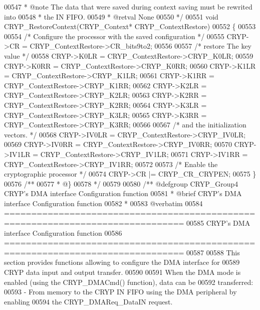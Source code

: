 \begin{DoxyCode}
00547 \textcolor{comment}{  * @note   The data that were saved during context saving must be rewrited into}
00548 \textcolor{comment}{  *         the IN FIFO.}
00549 \textcolor{comment}{  * @retval None}
00550 \textcolor{comment}{  */}
00551 \textcolor{keywordtype}{void} CRYP_RestoreContext(CRYP\_Context* CRYP\_ContextRestore)
00552 \{
00553 
00554   \textcolor{comment}{/* Configure the processor with the saved configuration */}
00555   CRYP->CR = CRYP\_ContextRestore->CR\_bits9to2;
00556 
00557   \textcolor{comment}{/* restore The key value */}
00558   CRYP->K0LR = CRYP\_ContextRestore->CRYP\_K0LR;
00559   CRYP->K0RR = CRYP\_ContextRestore->CRYP\_K0RR;
00560   CRYP->K1LR = CRYP\_ContextRestore->CRYP\_K1LR;
00561   CRYP->K1RR = CRYP\_ContextRestore->CRYP\_K1RR;
00562   CRYP->K2LR = CRYP\_ContextRestore->CRYP\_K2LR;
00563   CRYP->K2RR = CRYP\_ContextRestore->CRYP\_K2RR;
00564   CRYP->K3LR = CRYP\_ContextRestore->CRYP\_K3LR;
00565   CRYP->K3RR = CRYP\_ContextRestore->CRYP\_K3RR;
00566 
00567   \textcolor{comment}{/* and the initialization vectors. */}
00568   CRYP->IV0LR = CRYP\_ContextRestore->CRYP\_IV0LR;
00569   CRYP->IV0RR = CRYP\_ContextRestore->CRYP\_IV0RR;
00570   CRYP->IV1LR = CRYP\_ContextRestore->CRYP\_IV1LR;
00571   CRYP->IV1RR = CRYP\_ContextRestore->CRYP\_IV1RR;
00572 
00573   \textcolor{comment}{/* Enable the cryptographic processor */}
00574   CRYP->CR |= CRYP_CR_CRYPEN;
00575 \}
00576 \textcolor{comment}{/**}
00577 \textcolor{comment}{  * @\}}
00578 \textcolor{comment}{  */}
00579 
00580 \textcolor{comment}{/** @defgroup CRYP\_Group4 CRYP's DMA interface Configuration function}
00581 \textcolor{comment}{ *  @brief   CRYP's DMA interface Configuration function }
00582 \textcolor{comment}{ *}
00583 \textcolor{comment}{@verbatim   }
00584 \textcolor{comment}{ ===============================================================================}
00585 \textcolor{comment}{                   CRYP's DMA interface Configuration function}
00586 \textcolor{comment}{ ===============================================================================  }
00587 \textcolor{comment}{}
00588 \textcolor{comment}{  This section provides functions allowing to configure the DMA interface for }
00589 \textcolor{comment}{  CRYP data input and output transfer.}
00590 \textcolor{comment}{   }
00591 \textcolor{comment}{  When the DMA mode is enabled (using the CRYP\_DMACmd() function), data can be }
00592 \textcolor{comment}{  transferred:}
00593 \textcolor{comment}{  - From memory to the CRYP IN FIFO using the DMA peripheral by enabling }
00594 \textcolor{comment}{    the CRYP\_DMAReq\_DataIN request.}

\end{DoxyCode}
